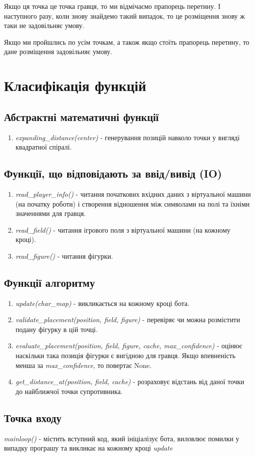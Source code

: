 \documentclass{article}
\begin{document}
Якщо ця точка це точка гравця, то ми відмічаємо прапорець перетину. І наступного разу, коли знову знайдемо такий випадок, то це розміщення знову ж таки не задовільняє умову.

Якщо ми пройшлись по усім точкам, а також якщо стоїть прапорець перетину, то дане розміщення задовільняє умову.

\section{Класифікація функцій}

\subsection{Абстрактні математичні функції}
\begin{enumerate}
    \item \textit{expanding\_distance(center)} - генерування позицій навколо точки у вигляді квадратної спіралі.
\end{enumerate}

\subsection{Функції, що відповідають за ввід/вивід (IO)}
\begin{enumerate}
    \item \textit{read\_player\_info()} - читання початкових вхідних даних з віртуальної машини (на початку роботи) і створення відношення між символами на полі та їхніми значеннями для гравця.
    \item \textit{read\_field()} - читання ігрового поля з віртуальної машини (на кожному кроці).
    \item \textit{read\_figure()} - читання фігурки.
\end{enumerate}

\subsection{Функції алгоритму}
\begin{enumerate}
    \item \textit{update(char\_map)} - викликається на кожному кроці бота.
    \item \textit{validate\_placement(position, field, figure)} - перевіряє чи можна розмістити подану фігурку в цій точці.
    \item \textit{evaluate\_placement(position, field, figure, cache, max\_confidence)} - оцінює наскільки така позиція фігурки є вигідною для гравця. Якщо впевненість менша за \textit{max\_confidence}, то повертає None.
    \item \textit{get\_distance\_at(position, field, cache)} - розраховує відстань від даної точки до найближчої точки супротивника.
\end{enumerate}

\subsection{Точка входу}
\textit{mainloop()} - містить вступний код, який ініціалізує бота, виловлює помилки у випадку програшу та викликає на кожному кроці \textit{update}
\end{document}
